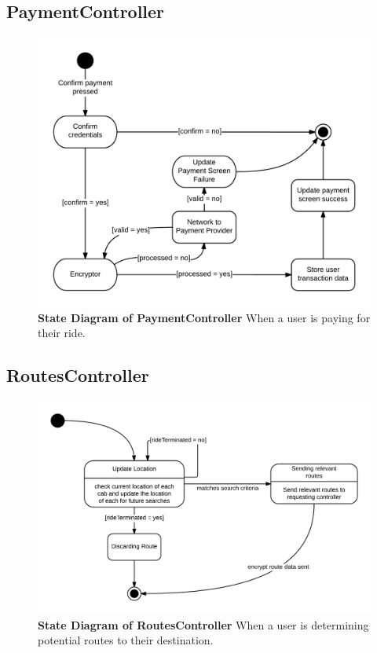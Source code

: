 \documentclass[]{article}
\begin{document}
\subsection{PaymentController}

\begin{figure}[H]
\label{PCState}
	\centering
	\includegraphics[width=1\textwidth]{PaymentController.png}
	\caption{\textbf{State Diagram of PaymentController} When a user is paying for their ride.}
\end{figure}

\subsection{RoutesController}

\begin{figure}[H]
\label{RCState}
	\centering
	\includegraphics[width=1\textwidth]{RoutesController.png}
	\caption{\textbf{State Diagram of RoutesController} When a user is determining potential routes to their destination.}
\end{figure}
\end{document}
